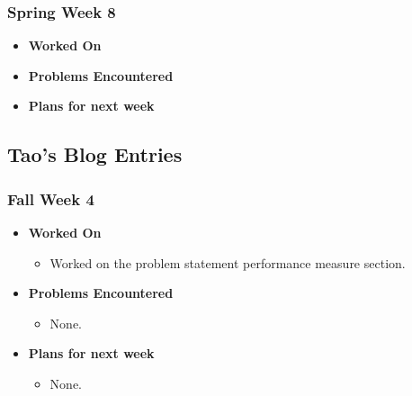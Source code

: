 \documentclass[compsoc,draftclsnofoot,onecolumn,10pt]{IEEEtran}
\begin{document}
\subsubsection{Spring Week 8}
\begin{itemize}
    \item {\textbf{Worked On}}
    \begin{itemize}

    \end{itemize}

    \item {\textbf{Problems Encountered}}
    \begin{itemize}

    \end{itemize}

    \item{\textbf{Plans for next week}}
    \begin{itemize}

    \end{itemize}

\end{itemize}

\subsection{Tao's Blog Entries}

\subsubsection{Fall Week 4}
\begin{itemize}
    \item {\textbf{Worked On}}
    \begin{itemize}
      \item Worked on the problem statement performance measure section.
    \end{itemize}

    \item {\textbf{Problems Encountered}}
    \begin{itemize}
      \item None.
    \end{itemize}

    \item{\textbf{Plans for next week}}
    \begin{itemize}
      \item None.
    \end{itemize}

\end{itemize}
\end{document}

